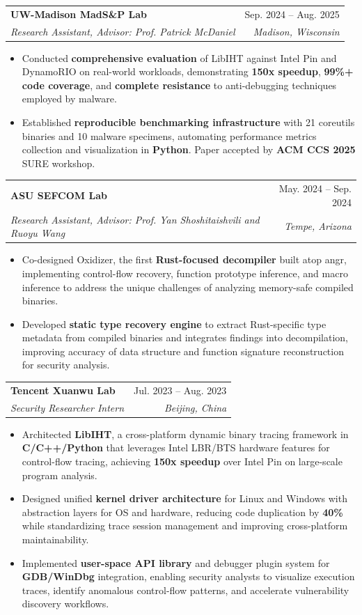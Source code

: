 \documentclass[letterpaper,10pt]{article}
\makeatletter
\newcommand{\resumeItem}[1]{
  \item\small{
    {#1 \vspace{-2pt}}
  }
}
\newcommand{\resumeSubheading}[4]{
  \vspace{-4pt}\item
    \begin{tabular*}{0.97\textwidth}[t]{l@{\extracolsep{\fill}}r}
      \textbf{#1} & #2 \\
      \textit{\small#3} & \textit{\small #4} \\
    \end{tabular*}\vspace{-7pt}
}
\newcommand{\resumeSubHeadingListStart}{\begin{itemize}[leftmargin=0.15in, label={}]}
\newcommand{\resumeSubHeadingListEnd}{\end{itemize}}
\newcommand{\resumeItemListStart}{\begin{itemize}[leftmargin=0.15in]}
\newcommand{\resumeItemListEnd}{\end{itemize}\vspace{-5pt}}
\makeatother
\begin{document}


\resumeSubheading
{UW-Madison MadS\&P Lab}{Sep. 2024 -- Aug. 2025}
{Research Assistant, Advisor: Prof. Patrick McDaniel}{Madison, Wisconsin}
\resumeItemListStart
\resumeItem{
  Conducted \textbf{comprehensive evaluation} of LibIHT against Intel Pin and DynamoRIO on real-world workloads, demonstrating \textbf{150x speedup}, \textbf{99\%+ code coverage}, and \textbf{complete resistance} to anti-debugging techniques employed by malware.
}
\resumeItem{
  Established \textbf{reproducible benchmarking infrastructure} with 21 coreutils binaries and 10 malware specimens, automating performance metrics collection and visualization in \textbf{Python}. Paper accepted by \textbf{ACM CCS 2025} SURE workshop.
}
\resumeItemListEnd

\resumeSubheading
{ASU SEFCOM Lab}{May. 2024 -- Sep. 2024}
{Research Assistant, Advisor: Prof. Yan Shoshitaishvili and Ruoyu Wang}{Tempe, Arizona}
\resumeItemListStart
\resumeItem{
  Co-designed Oxidizer, the first \textbf{Rust-focused decompiler} built atop angr, implementing control-flow recovery, function prototype inference, and macro inference to address the unique challenges of analyzing memory-safe compiled binaries.
}
\resumeItem{
  Developed \textbf{static type recovery engine} to extract Rust-specific type metadata from compiled binaries and integrates findings into decompilation, improving accuracy of data structure and function signature reconstruction for security analysis.
}
\resumeItemListEnd

\resumeSubheading
{Tencent Xuanwu Lab}{Jul. 2023 -- Aug. 2023}
{Security Researcher Intern}{Beijing, China}
\resumeItemListStart
\resumeItem{
  Architected \textbf{LibIHT}, a cross-platform dynamic binary tracing framework in \textbf{C/C++/Python} that leverages Intel LBR/BTS hardware features for control-flow tracing, achieving \textbf{150x speedup} over Intel Pin on large-scale program analysis.
}
\resumeItem{
  Designed unified \textbf{kernel driver architecture} for Linux and Windows with abstraction layers for OS and hardware, reducing code duplication by \textbf{40\%} while standardizing trace session management and improving cross-platform maintainability.
}
\resumeItem{
  Implemented \textbf{user-space API library} and debugger plugin system for \textbf{GDB/WinDbg} integration, enabling security analysts to visualize execution traces, identify anomalous control-flow patterns, and accelerate vulnerability discovery workflows.
}
\resumeItemListEnd
\end{document}
